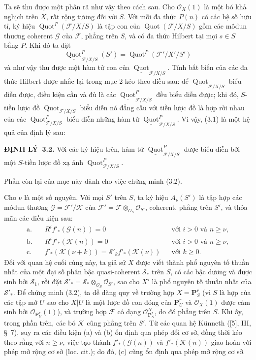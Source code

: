 \documentclass[11pt,twoside,openany]{book}
\numberwithin{equation}{section}
\newcommand{\src}[1]{%
  \phantomsection\hypertarget{src:\fgasourceid:#1}{}%
  \marginpar{\raggedleft\footnotesize\sffamily #1}%
}
\newcommand{\fgasourceid}{unset}
\newcommand{\result}[2]{\par\medskip\noindent\textbf{#1\if\relax\detokenize{#2}\relax\else\ #2\fi.}\quad}
\begin{document}
Ta sẽ thu được một phân rã như vậy theo cách sau. Cho $\mathcal O_X(1)$ là một
bó khả nghịch trên $X$, rất rộng tương đối với $S$. Với mỗi đa thức $P(n)$ có
các hệ số hữu tỉ, ký hiệu $\operatorname{Quot}^P(\mathcal F/X/S)$ là tập con
của $\operatorname{Quot}(\mathcal F/X/S)$ gồm các môđun thương coherent
$\mathcal G$ của $\mathcal F$, phẳng trên $S$, và có đa thức Hilbert tại mọi
$s\in S$ bằng $P$. Khi đó ta đặt
\[
\underline{\operatorname{Quot}}^P_{\mathcal F/X/S}(S')
=\operatorname{Quot}^P(\mathcal F'/X'/S')
\]
và như vậy thu được một hàm tử con của
$\underline{\operatorname{Quot}}_{\mathcal F/X/S}$. Tính bất biến của các đa
thức Hilbert được nhắc lại trong mục 2 kéo theo điều sau: để
$\underline{\operatorname{Quot}}_{\mathcal F/X/S}$ biểu diễn được, điều kiện
cần và đủ là các $\underline{\operatorname{Quot}}^P_{\mathcal F/X/S}$ đều
biểu diễn được; khi đó, $S$-tiền lược đồ
$\operatorname{Quot}_{\mathcal F/X/S}$ biểu diễn nó đẳng cấu với tiền lược đồ
là hợp rời nhau của các $\operatorname{Quot}^P_{\mathcal F/X/S}$ biểu diễn
những hàm tử $\underline{\operatorname{Quot}}^P_{\mathcal F/X/S}$. Vì vậy,
(3.1) là một hệ quả của định lý sau:
\src{260}
\result{ĐỊNH LÝ}{3.2} Với các ký hiệu trên, hàm tử
$\underline{\operatorname{Quot}}^P_{\mathcal F/X/S}$ được biểu diễn bởi một
$S$-tiền lược đồ xạ ảnh $\operatorname{Quot}^P_{\mathcal F/X/S}$.

Phần còn lại của mục này dành cho việc chứng minh (3.2).

Cho $\nu$ là một số nguyên. Với mọi $S'$ trên $S$, ta ký hiệu $A_\nu(S')$ là
tập hợp các môđun thương $\mathcal G=\mathcal F'/\mathcal K$ của
$\mathcal F'=\mathcal F\otimes_{\mathcal O_S}\mathcal O_{S'}$, coherent,
phẳng trên $S'$, và thỏa mãn các điều kiện sau:
\begin{align*}
\text{a.}\quad &R^if'_*(\mathcal G(n))=0 &&\text{với $i>0$ và $n\geq\nu$},\\
\text{b.}\quad &R^if'_*(\mathcal K(n))=0 &&\text{với $i>0$ và $n\geq\nu$},\\
\text{c.}\quad &f'_*(\mathcal K(\nu+k))
=\mathcal S'_k f'_*(\mathcal K(\nu)) &&\text{với $k\geq0$}.
\end{align*}
Đối với quan hệ cuối cùng này, ta giả sử $X$ được viết thành phổ nguyên tố
thuần nhất của một đại số phân bậc quasi-coherent $\mathcal S_*$ trên $S$, có
các bậc dương và được sinh bởi $\mathcal S_1$, rồi đặt
$\mathcal S'_* =\mathcal S_*\otimes_{\mathcal O_S}\mathcal O_{S'}$, sao cho
$X'$ là phổ nguyên tố thuần nhất của $\mathcal S'_*$. Để chứng minh (3.2), ta
dễ dàng quy về trường hợp $X=\mathbf P^r_S$ (vì $S$ là hợp của các tập mở $U$
sao cho $X|U$ là một lược đồ con đóng của $\mathbf P^r_U$ và
$\mathcal O_X(1)$ được cảm sinh bởi $\mathcal O_{\mathbf P^r_U}(1)$), và
trường hợp $\mathcal F$ có dạng $\mathcal O_{\mathbf P^r_S}^{N}$, do đó phẳng
trên $S$. Khi ấy, trong phần trên, các bó $\mathcal K$ cũng phẳng trên $S'$.
Từ các quan hệ Künneth ([5], III, \S~7), suy ra các điều kiện (a) và (b) ổn
định qua phép đổi cơ sở, đồng thời kéo theo rằng với $n\geq\nu$, việc tạo thành
$f'_*(\mathcal G(n))$ và $f'_*(\mathcal K(n))$ giao hoán với phép mở rộng cơ
sở (loc. cit.); do đó, (c) cũng ổn định qua phép mở rộng cơ sở.
\end{document}
